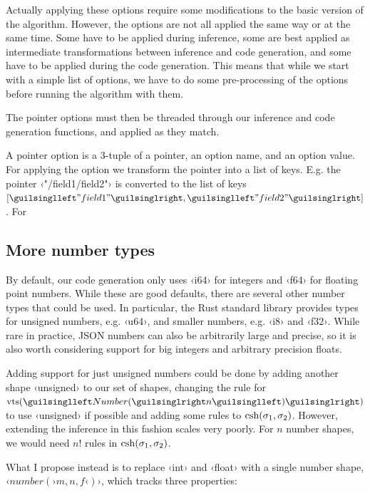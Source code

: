 Actually applying these options require some modifications to the basic version of the algorithm. However, the options are not all applied the same way or at the same time. Some have to be applied during inference, some are best applied as intermediate transformations between inference and code generation, and some have to be applied during the code generation. This means that while we start with a simple list of options, we have to do some pre-processing of the options before running the algorithm with them.

The pointer options must then be threaded through our inference and code generation functions, and applied as they match.

A pointer option is a 3-tuple of a pointer, an option name, and an option value. For applying the option we transform the pointer into a list of keys. E.g. the pointer ‹"/field1/field2"› is converted to the list of keys $[‹"field1"›, ‹"field2"›]$. For





\subsection{More number types}
\label{sec:unsigned}

By default, our code generation only uses ‹i64› for integers and ‹f64› for floating point numbers. While these are good defaults, there are several other number types that could be used. In particular, the Rust standard library provides types for unsigned numbers, e.g. ‹u64›, and smaller numbers, e.g. ‹i8› and ‹f32›. While rare in practice, JSON numbers can also be arbitrarily large and precise, so it is also worth considering support for big integers and arbitrary precision floats.

Adding support for just unsigned numbers could be done by adding another shape ‹unsigned› to our set of shapes, changing the rule for $\shap(‹Number(›n‹)›)$ to use ‹unsigned› if possible and adding some rules to $\operatorname{csh}(\sigma_1, \sigma_2)$. However, extending the inference in this fashion scales very poorly. For $n$ number shapes, we would need $n!$ rules in $\operatorname{csh}(\sigma_1, \sigma_2)$.

What I propose instead is to replace ‹int› and ‹float› with a single number shape, $‹number(› m, n, f ‹)›$, which tracks three properties:

